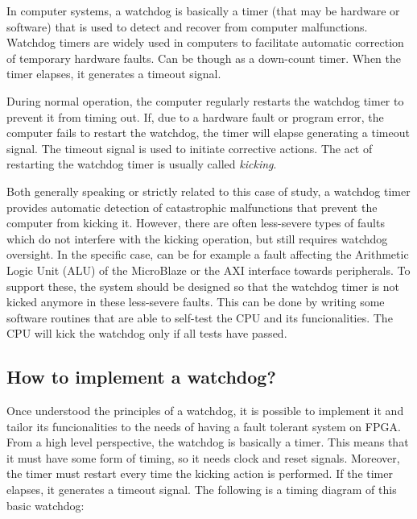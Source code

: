In computer systems, a watchdog is basically a timer (that may be hardware or software) that is used to detect and recover from computer malfunctions. Watchdog timers are widely used in computers to facilitate automatic correction of temporary hardware faults. Can be though as a down-count timer. When the timer elapses, it generates a timeout signal.\bigskip

During normal operation, the computer regularly restarts the watchdog timer to prevent it from timing out. If, due to a hardware fault or program error, the computer fails to restart the watchdog, the timer will elapse generating a timeout signal. The timeout signal is used to initiate corrective actions. The act of restarting the watchdog timer is usually called \textit{kicking}. \bigskip

Both generally speaking or strictly related to this case of study, a watchdog timer provides automatic detection of catastrophic malfunctions that prevent the computer from kicking it. However, there are often less-severe types of faults which do not interfere with the kicking operation, but still requires watchdog oversight. In the specific case, can be for example a fault affecting the Arithmetic Logic Unit (ALU) of the MicroBlaze or the AXI interface towards peripherals. To support these, the system should be designed so that the watchdog timer is not kicked anymore in these less-severe faults. This can be done by writing some software routines that are able to self-test the CPU and its funcionalities. The CPU will kick the watchdog only if all tests have passed.


\subsection{How to implement a watchdog?}

Once understood the principles of a watchdog, it is possible to implement it and tailor its funcionalities to the needs of having a fault tolerant system on FPGA. From a high level perspective, the watchdog is basically a timer. This means that it must have some form of timing, so it needs clock and reset signals. Moreover, the timer must restart every time the kicking action is performed. If the timer elapses, it generates a timeout signal. The following is a timing diagram of this basic watchdog:

